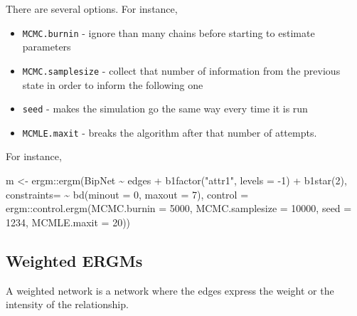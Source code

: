\documentclass[
]{article}
\newenvironment{Shaded}{\begin{snugshade}}{\end{snugshade}}
\newcommand{\AttributeTok}[1]{\textcolor[rgb]{0.77,0.63,0.00}{#1}}
\newcommand{\DecValTok}[1]{\textcolor[rgb]{0.00,0.00,0.81}{#1}}
\newcommand{\FunctionTok}[1]{\textcolor[rgb]{0.00,0.00,0.00}{#1}}
\newcommand{\NormalTok}[1]{#1}
\newcommand{\OtherTok}[1]{\textcolor[rgb]{0.56,0.35,0.01}{#1}}
\newcommand{\SpecialCharTok}[1]{\textcolor[rgb]{0.00,0.00,0.00}{#1}}
\newcommand{\StringTok}[1]{\textcolor[rgb]{0.31,0.60,0.02}{#1}}
\begin{document}
There are several options. For instance,

\begin{itemize}
\item
  \texttt{MCMC.burnin} - ignore than many chains before starting to
  estimate parameters
\item
  \texttt{MCMC.samplesize} - collect that number of information from the
  previous state in order to inform the following one
\item
  \texttt{seed} - makes the simulation go the same way every time it is
  run
\item
  \texttt{MCMLE.maxit} - breaks the algorithm after that number of
  attempts.
\end{itemize}

For instance,

\begin{Shaded}
\begin{Highlighting}[]
\NormalTok{m }\OtherTok{\textless{}{-}}\NormalTok{ ergm}\SpecialCharTok{::}\FunctionTok{ergm}\NormalTok{(BipNet }\SpecialCharTok{\textasciitilde{}}\NormalTok{ edges  }\SpecialCharTok{+} \FunctionTok{b1factor}\NormalTok{(}\StringTok{"attr1"}\NormalTok{, }\AttributeTok{levels =} \SpecialCharTok{{-}}\DecValTok{1}\NormalTok{) }\SpecialCharTok{+} \FunctionTok{b1star}\NormalTok{(}\DecValTok{2}\NormalTok{),}
                 \AttributeTok{constraints=} \SpecialCharTok{\textasciitilde{}} \FunctionTok{bd}\NormalTok{(}\AttributeTok{minout =} \DecValTok{0}\NormalTok{, }\AttributeTok{maxout =} \DecValTok{7}\NormalTok{),}
                 \AttributeTok{control =}\NormalTok{ ergm}\SpecialCharTok{::}\FunctionTok{control.ergm}\NormalTok{(}\AttributeTok{MCMC.burnin =} \DecValTok{5000}\NormalTok{,}
                                              \AttributeTok{MCMC.samplesize =} \DecValTok{10000}\NormalTok{,}
                                              \AttributeTok{seed =} \DecValTok{1234}\NormalTok{,}
                                              \AttributeTok{MCMLE.maxit =} \DecValTok{20}\NormalTok{))}
\end{Highlighting}
\end{Shaded}

\hypertarget{weighted-ergms}{%
\subsection{Weighted ERGMs}\label{weighted-ergms}}

A weighted network is a network where the edges express the weight or
the intensity of the relationship.
\end{document}
